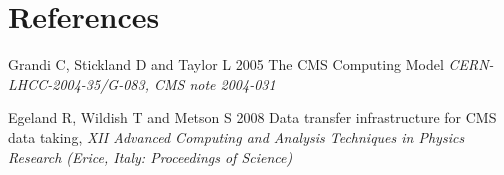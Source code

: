 \section*{References}

\begin{thebibliography}{1}

  Grandi C, Stickland D and Taylor L 2005 The CMS Computing Model {\it CERN-LHCC-2004-35/G-083, CMS note 2004-031}

  Egeland R, Wildish T and Metson S 2008 Data transfer infrastructure for CMS data taking,  {\it XII Advanced Computing and Analysis Techniques in Physics Research (Erice, Italy: Proceedings of Science)}

\end{thebibliography}
